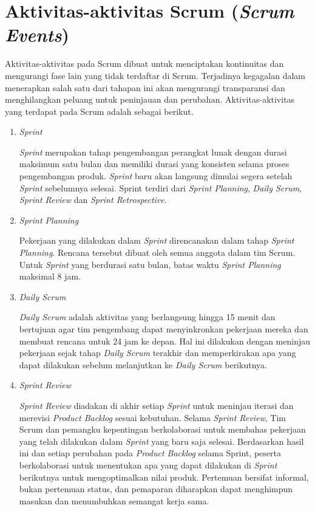 \section{Aktivitas-aktivitas Scrum (\textit{Scrum Events})}
Aktivitas-aktivitas pada Scrum dibuat untuk menciptakan kontinuitas dan mengurangi fase lain yang tidak terdaftar di Scrum. Terjadinya kegagalan dalam menerapkan salah satu dari tahapan ini akan mengurangi transparansi dan menghilangkan peluang untuk peninjauan dan perubahan. Aktivitas-aktivitas yang terdapat pada Scrum adalah sebagai berikut.
\begin{enumerate}
	\item \textit{Sprint}
	
	\textit{Sprint} merupakan tahap pengembangan perangkat lunak dengan durasi maksimum satu bulan dan memiliki durasi yang konsisten selama proses pengembangan produk. \textit{Sprint} baru akan langsung dimulai segera setelah \textit{Sprint} sebelumnya selesai. Sprint terdiri dari \textit{Sprint Planning}, \textit{Daily Scrum}, \textit{Sprint Review} dan \textit{Sprint Retrospective}.
	
	\item \textit{Sprint Planning}
	
	Pekerjaan yang dilakukan dalam \textit{Sprint} direncanakan dalam tahap \textit{Sprint Planning}. Rencana tersebut dibuat oleh semua anggota dalam tim Scrum. Untuk \textit{Sprint} yang berdurasi satu bulan, batas waktu \textit{Sprint Planning} maksimal 8 jam.
	
	\item \textit{Daily Scrum}
	
	\textit{Daily Scrum} adalah aktivitas yang berlangsung hingga 15 menit dan bertujuan agar tim pengembang dapat menyinkronkan pekerjaan mereka dan membuat rencana untuk 24 jam ke depan. Hal ini dilakukan dengan meninjau pekerjaan sejak tahap \textit{Daily Scrum} terakhir dan memperkirakan apa yang dapat dilakukan sebelum melanjutkan ke \textit{Daily Scrum} berikutnya.
	
	\item \textit{Sprint Review}
	
	\textit{Sprint Review} diadakan di akhir setiap \textit{Sprint} untuk meninjau iterasi dan merevisi \textit{Product Backlog} sesuai kebutuhan. Selama \textit{Sprint Review}, Tim Scrum dan pemangku kepentingan berkolaborasi untuk membahas pekerjaan yang telah dilakukan dalam \textit{Sprint} yang baru saja selesai. Berdasarkan hasil ini dan setiap perubahan pada \textit{Product Backlog} selama Sprint, peserta berkolaborasi untuk menentukan apa yang dapat dilakukan di \textit{Sprint} berikutnya untuk mengoptimalkan nilai produk. Pertemuan bersifat informal, bukan pertemuan status, dan pemaparan diharapkan dapat menghimpun masukan dan menumbuhkan semangat kerja sama.
	

\end{enumerate}
